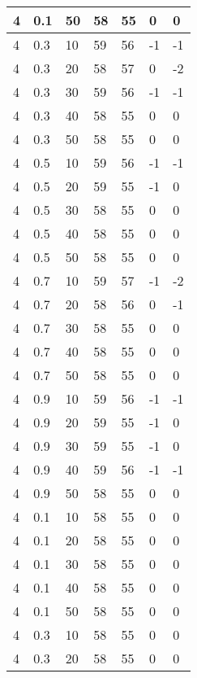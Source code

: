 \begin{longtable}{|l|l|l|l|l|l|l|}
		4     & 0.1 & 50   & 58 & 55 & 0   & 0   \\ \hline
		4     & 0.3 & 10   & 59 & 56 & -1  & -1  \\ \hline
		4     & 0.3 & 20   & 58 & 57 & 0   & -2  \\ \hline
		4     & 0.3 & 30   & 59 & 56 & -1  & -1  \\ \hline
		4     & 0.3 & 40   & 58 & 55 & 0   & 0   \\ \hline
		4     & 0.3 & 50   & 58 & 55 & 0   & 0   \\ \hline
		4     & 0.5 & 10   & 59 & 56 & -1  & -1  \\ \hline
		4     & 0.5 & 20   & 59 & 55 & -1  & 0   \\ \hline
		4     & 0.5 & 30   & 58 & 55 & 0   & 0   \\ \hline
		4     & 0.5 & 40   & 58 & 55 & 0   & 0   \\ \hline
		4     & 0.5 & 50   & 58 & 55 & 0   & 0   \\ \hline
		4     & 0.7 & 10   & 59 & 57 & -1  & -2  \\ \hline
		4     & 0.7 & 20   & 58 & 56 & 0   & -1  \\ \hline
		4     & 0.7 & 30   & 58 & 55 & 0   & 0   \\ \hline
		4     & 0.7 & 40   & 58 & 55 & 0   & 0   \\ \hline
		4     & 0.7 & 50   & 58 & 55 & 0   & 0   \\ \hline
		4     & 0.9 & 10   & 59 & 56 & -1  & -1  \\ \hline
		4     & 0.9 & 20   & 59 & 55 & -1  & 0   \\ \hline
		4     & 0.9 & 30   & 59 & 55 & -1  & 0   \\ \hline
		4     & 0.9 & 40   & 59 & 56 & -1  & -1  \\ \hline
		4     & 0.9 & 50   & 58 & 55 & 0   & 0   \\ \hline
		4     & 0.1 & 10   & 58 & 55 & 0   & 0   \\ \hline
		4     & 0.1 & 20   & 58 & 55 & 0   & 0   \\ \hline
		4     & 0.1 & 30   & 58 & 55 & 0   & 0   \\ \hline
		4     & 0.1 & 40   & 58 & 55 & 0   & 0   \\ \hline
		4     & 0.1 & 50   & 58 & 55 & 0   & 0   \\ \hline
		4     & 0.3 & 10   & 58 & 55 & 0   & 0   \\ \hline
		4     & 0.3 & 20   & 58 & 55 & 0   & 0   \\ \hline

\end{longtable}
